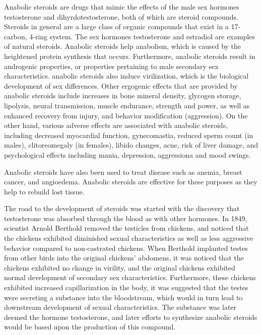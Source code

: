 Anabolic steroids are drugs that mimic the effects of the male sex hormones testosterone and dihyrdotestosterone, both of which are steroid compounds. \cite{nida} Steroids in general are a large class of organic compounds that exist in a 17-carbon, 4-ring system. \cite{mw}The sex hormones testosterone and estradiol are examples of natural steroids. Anabolic steroids help anabolism, which is caused by the heightened protein synthesis that occurs. Furthermore, anabolic steroids result in androgenic properties, or properties pertaining to  male secondary sex characteristics. anabolic steroids also induce virilization, which is the biological development of sex differences. Other ergogenic effects that are provided by anabolic steroids include increases in bone mineral density, glycogen storage, lipolysis, neural transmission, muscle endurance, strength and power, as well as enhanced recovery from injury, and behavior modification (aggression). On the other hand, various adverse effects are associated with anabolic steroids, including decreased myocardial function, gynecomastia, reduced sperm count (in males), clitoreomegaly (in females), libido changes, acne, risk of liver damage, and psychological effects including mania, depression, aggressiona and mood swings. \cite{hoffman}
	
Anabolic steroids have also been used to treat disease such as anemia, breast cancer, and angioedema. Anabolic steroids are effective for these purposes as they help to rebuild lost tissue. \cite{mayo_ana}
	
The road to the development of steroids was started with the discovery that testosterone was absorbed through the blood as with other hormones. In 1849, scientist Arnold Berthold removed the testicles from chickens, and noticed that the chickens exhibited diminished sexual characteristics as well as less aggressive behavior compared to non-castrated chickens. When Berthold implanted testes from other birds into the original chickens' abdomens, it was noticed that the chickens exhibited no change in virility, and the original chickens exhibited normal development of secondary sex characteristics. Furthermore, these chickens exhibited increased capillarization in the body, it was suggested that the testes were secreting a substance into the bloodstream, which would in turn lead to downstream development of sexual characteristics. The substance was later deemed the hormone testosterone, and later efforts to synthesize anabolic steroids would be based upon the production of this compound. \cite{mehta}
	
